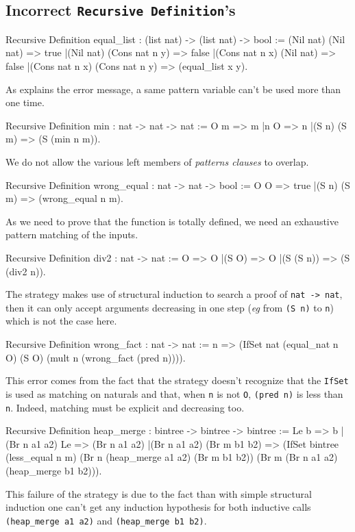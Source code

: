 \subsection*{Incorrect {\tt Recursive Definition}'s}
\begin{coq_example}
Recursive Definition equal_list : (list nat) -> (list nat) -> bool :=
  (Nil nat) (Nil nat) => true
 |(Nil nat) (Cons nat n y) => false
 |(Cons nat n x) (Nil nat) => false
 |(Cons nat n x) (Cons nat n y) => (equal_list x y).
\end{coq_example}
As explains the error message, a same pattern variable can't be used
more than one time.
\begin{coq_example}
Recursive Definition min : nat -> nat -> nat :=
  O m => m
 |n O => n
 |(S n) (S m) => (S (min n m)).
\end{coq_example}
We do not allow the various left members of {\sl patterns clauses} to
overlap.
\begin{coq_example}
Recursive Definition wrong_equal : nat -> nat -> bool :=
  O O => true
 |(S n) (S m) => (wrong_equal n m).
\end{coq_example}
As we need to prove that the function is totally defined, we need an
exhaustive pattern matching of the inputs.
\begin{coq_example}
Recursive Definition div2 : nat -> nat :=
  O => O
 |(S O) => O
 |(S (S n)) => (S (div2 n)).
\end{coq_example}
The strategy makes use of structural induction to search a proof of
{\tt nat -> nat}, then it can only accept arguments decreasing in one
step ({\it eg} from {\tt (S n)} to {\tt n}) which is not the case
here.
\begin{coq_example}
Recursive Definition wrong_fact : nat -> nat :=
 n => (IfSet nat (equal_nat n O) (S O) (mult n (wrong_fact (pred n)))).
\end{coq_example}
This error comes from the fact that the strategy doesn't recognize
that the {\tt IfSet} is used as matching on naturals and that, when
{\tt n} is not {\tt O}, {\tt (pred n)} is less than {\tt n}. Indeed,
matching must be explicit and decreasing too.
\begin{coq_example}
Recursive Definition heap_merge : bintree -> bintree -> bintree :=
  Le b => b
 |(Br n a1 a2) Le => (Br n a1 a2)
 |(Br n a1 a2) (Br m b1 b2)
  => (IfSet bintree
         (less_equal n m)
         (Br n (heap_merge a1 a2) (Br m b1 b2))
         (Br m (Br n a1 a2) (heap_merge  b1 b2))).
\end{coq_example}
This failure of the strategy is due to the fact than with simple
structural induction one can't get any induction hypothesis for both
inductive calls {\tt (heap\_merge a1 a2)} and {\tt (heap\_merge b1
  b2)}.


